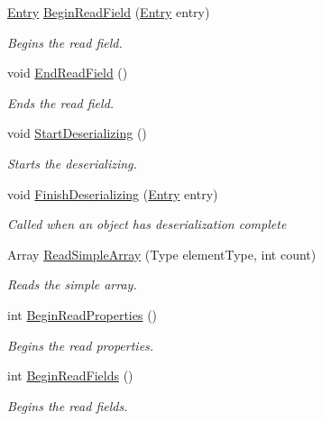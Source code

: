 \begin{DoxyCompactItemize}
\hyperlink{class_serialization_1_1_entry}{Entry} \hyperlink{class_serialization_1_1_binary_serializer_ab6dd090acf50ee9f39d461fa7e7c61d6}{Begin\+Read\+Field} (\hyperlink{class_serialization_1_1_entry}{Entry} entry)
\begin{DoxyCompactList}\small\item\em Begins the read field. \end{DoxyCompactList}\item 
void \hyperlink{class_serialization_1_1_binary_serializer_a0c52bbac20e29e59f6c48868d4729928}{End\+Read\+Field} ()
\begin{DoxyCompactList}\small\item\em Ends the read field. \end{DoxyCompactList}\item 
void \hyperlink{class_serialization_1_1_binary_serializer_a379a76963492f1fb3a8168e794148683}{Start\+Deserializing} ()
\begin{DoxyCompactList}\small\item\em Starts the deserializing. \end{DoxyCompactList}\item 
void \hyperlink{class_serialization_1_1_binary_serializer_ad89d25a0b56c1b568f6696ab8d04d10b}{Finish\+Deserializing} (\hyperlink{class_serialization_1_1_entry}{Entry} entry)
\begin{DoxyCompactList}\small\item\em Called when an object has deserialization complete \end{DoxyCompactList}\item 
Array \hyperlink{class_serialization_1_1_binary_serializer_a611b0f83ba611a0ecf394a9920dbab1b}{Read\+Simple\+Array} (Type element\+Type, int count)
\begin{DoxyCompactList}\small\item\em Reads the simple array. \end{DoxyCompactList}\item 
int \hyperlink{class_serialization_1_1_binary_serializer_ae6b1ddb821a9809f1428640e3bd75e7b}{Begin\+Read\+Properties} ()
\begin{DoxyCompactList}\small\item\em Begins the read properties. \end{DoxyCompactList}\item 
int \hyperlink{class_serialization_1_1_binary_serializer_aa92efbd2f56eeb65e80890ed4bf3bdbe}{Begin\+Read\+Fields} ()
\begin{DoxyCompactList}\small\item\em Begins the read fields. \end{DoxyCompactList}\item 

\end{DoxyCompactItemize}
